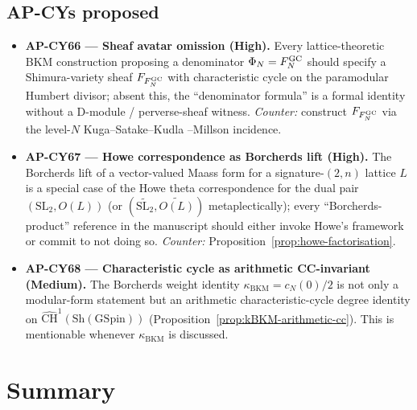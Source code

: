 \documentclass[11pt]{amsart}
\theoremstyle{definition}
\providecommand{\kBKM}{\kappa_{\mathrm{BKM}}}
\providecommand{\Sh}{\mathrm{Sh}}
\providecommand{\GSpin}{\mathrm{GSpin}}
\providecommand{\SL}{\mathrm{SL}}
\providecommand{\cF}{\mathcal{F}}
\providecommand{\cCH}{\widehat{\mathrm{CH}}}
\begin{document}
\subsection{AP-CYs proposed}

\begin{itemize}
 \item \textbf{AP-CY66 --- Sheaf avatar omission (High).} Every
   lattice-theoretic BKM construction proposing a denominator
   $\Phi_N = F^{\rm GC}_N$ should specify a Shimura-variety
   sheaf $\cF_{F^{\rm GC}_N}$ with characteristic cycle on the
   paramodular Humbert divisor; absent this, the
   ``denominator formula'' is a formal identity without a
   D-module / perverse-sheaf witness. \emph{Counter:} construct
   $\cF_{F^{\rm GC}_N}$ via the level-$N$ Kuga--Satake--Kudla
   --Millson incidence.
 \item \textbf{AP-CY67 --- Howe correspondence as Borcherds lift
   (High).} The Borcherds lift of a vector-valued Maass form for a
   signature-$(2, n)$ lattice $L$ is a special case of the
   Howe theta correspondence for the dual pair $(\SL_2, O(L))$ (or
   $(\widetilde{\SL_2}, \widetilde{O(L)})$ metaplectically); every
   ``Borcherds-product'' reference in the manuscript should either
   invoke Howe's framework or commit to not doing so.
   \emph{Counter:} Proposition~\ref{prop:howe-factorisation}.
 \item \textbf{AP-CY68 --- Characteristic cycle as arithmetic
   CC-invariant (Medium).} The Borcherds weight identity
   $\kBKM = c_N(0)/2$ is not only a modular-form statement but an
   arithmetic characteristic-cycle degree identity on
   $\cCH^1(\Sh(\GSpin))$ (Proposition~\ref{prop:kBKM-arithmetic-cc}).
   This is mentionable whenever $\kBKM$ is discussed.
\end{itemize}

\section*{Summary}
\end{document}
